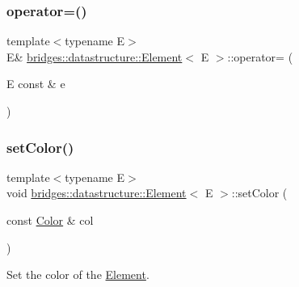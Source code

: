 \mbox{\label{classbridges_1_1datastructure_1_1_element_a18ffc753328275e95bb1ee967f88a00a}} 
\subsubsection{\texorpdfstring{operator=()}{operator=()}\hspace{0.1cm}{\footnotesize\ttfamily [2/2]}}
{\footnotesize\ttfamily template$<$typename E$>$ \\
E\& \mbox{\hyperlink{classbridges_1_1datastructure_1_1_element}{bridges\+::datastructure\+::\+Element}}$<$ E $>$\+::operator= (\begin{DoxyParamCaption}\item[{E const \&}]{e }\end{DoxyParamCaption})\hspace{0.3cm}{\ttfamily [inline]}}

\mbox{\label{classbridges_1_1datastructure_1_1_element_a17d75aae50a48b3404f3c6811c62ae1c}} 
\subsubsection{\texorpdfstring{setColor()}{setColor()}\hspace{0.1cm}{\footnotesize\ttfamily [1/2]}}
{\footnotesize\ttfamily template$<$typename E$>$ \\
void \mbox{\hyperlink{classbridges_1_1datastructure_1_1_element}{bridges\+::datastructure\+::\+Element}}$<$ E $>$\+::set\+Color (\begin{DoxyParamCaption}\item[{const \mbox{\hyperlink{classbridges_1_1datastructure_1_1_color}{Color}} \&}]{col }\end{DoxyParamCaption})\hspace{0.3cm}{\ttfamily [inline]}}



Set the color of the \mbox{\hyperlink{classbridges_1_1datastructure_1_1_element}{Element}}. 


